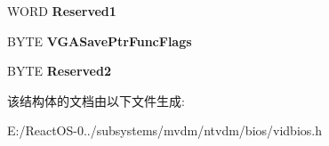 \begin{DoxyCompactItemize}
\mbox{\label{struct___v_g_a___s_t_a_t_i_c___f_u_n_c___t_a_b_l_e_a5917951ed10a072ae414f3bd757b0281}} 
W\+O\+RD {\bfseries Reserved1}
\item 
\mbox{\label{struct___v_g_a___s_t_a_t_i_c___f_u_n_c___t_a_b_l_e_af75886913c1f53a54fd84539a5e4cea1}} 
B\+Y\+TE {\bfseries V\+G\+A\+Save\+Ptr\+Func\+Flags}
\item 
\mbox{\label{struct___v_g_a___s_t_a_t_i_c___f_u_n_c___t_a_b_l_e_ade8a2c801c8a03cd73b154709ac3c2c0}} 
B\+Y\+TE {\bfseries Reserved2}
\end{DoxyCompactItemize}


该结构体的文档由以下文件生成\+:\begin{DoxyCompactItemize}
\item 
E\+:/\+React\+O\+S-\/0../subsystems/mvdm/ntvdm/bios/vidbios.\+h\end{DoxyCompactItemize}
